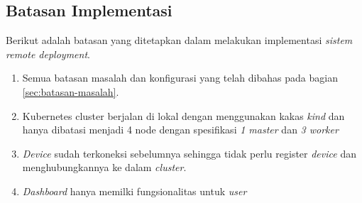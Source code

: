 \subsection{Batasan Implementasi}
Berikut adalah batasan yang ditetapkan dalam melakukan implementasi \textit{sistem remote deployment}.

\begin{enumerate}
  \item Semua batasan masalah dan konfigurasi yang telah dibahas pada bagian \ref{sec:batasan-masalah}.
  \item Kubernetes cluster berjalan di lokal dengan menggunakan kakas \textit{kind} dan hanya dibatasi menjadi 4 node dengan spesifikasi \textit{1 master} dan \textit{3 worker}
  \item \textit{Device} sudah terkoneksi sebelumnya sehingga tidak perlu register \textit{device} dan menghubungkannya ke dalam \textit{cluster}.
  \item \textit{Dashboard} hanya memilki fungsionalitas untuk \textit{user}
\end{enumerate}